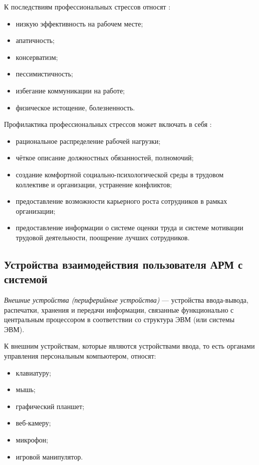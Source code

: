 К последствиям профессиональных стрессов относят \cite{professionalStress}:
\begin{itemize}[leftmargin=1.6\parindent]
\item низкую эффективность на рабочем месте;
\item апатичность;
\item консерватизм;
\item пессимистичность;
\item избегание коммуникации на работе;
\item физическое истощение, болезненность.
\end{itemize}

Профилактика профессиональных стрессов может включать в себя \cite{professionalStress}:
\begin{itemize}[leftmargin=1.6\parindent]
\item рациональное распределение рабочей нагрузки;
\item чёткое описание должностных обязанностей, полномочий;
\item создание комфортной социально-психологической среды в трудовом коллективе и организации, устранение конфликтов;
\item предоставление возможности карьерного роста сотрудников в рамках организации;
\item предоставление информации о системе оценки труда и системе мотивации трудовой деятельности, поощрение лучших сотрудников.
\end{itemize}

\subsection{Устройства взаимодействия пользователя АРМ с системой}
\textit{Внешние устройства (периферийные устройства)} --- устройства ввода-вывода, распечатки, хранения и передачи информации, связанные функционально с центральным процессором в соответствии со структура ЭВМ (или системы ЭВМ). \cite{encDic}

К внешним устройствам, которые являются устройствами ввода, то есть органами управления персональным компьютером, относят:
\begin{itemize}[leftmargin=1.6\parindent]
\item клавиатуру;
\item мышь;
\item графический планшет;
\item веб-камеру;
\item микрофон;
\item игровой манипулятор.
\end{itemize}

